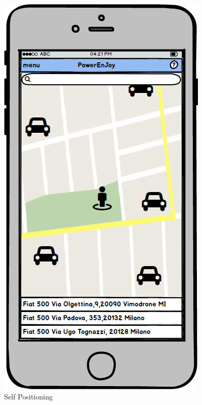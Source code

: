 \documentclass[a4paper,11pt]{article}
\begin{document}
\begin{itemize}
\begin{figure}[H]
  \centering
  \begin{minipage}[t]{.35\linewidth}
    \includegraphics[width=\textwidth]{images/self}  
  \caption{Self Positioning}\label{fig-self}
  \end{minipage}

\end{figure}
\end{itemize}
\end{document}
